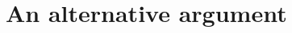 \documentclass[
  11pt,
	colorful,
	raggedright,
]{tufte-style-thesis-flip}
\begin{document}
\section{An alternative argument}
\label{sec:stokes:theorem:aside}

\end{document}
